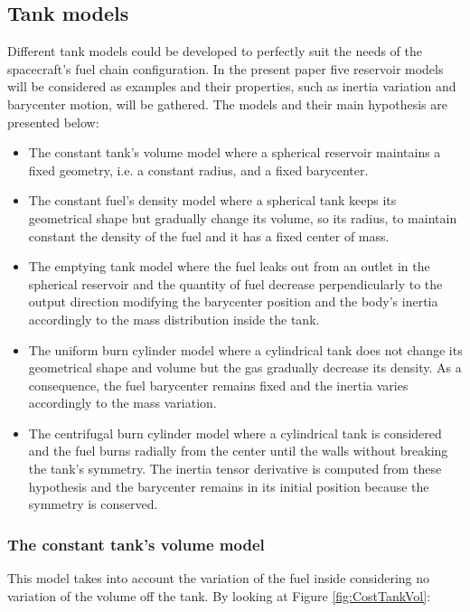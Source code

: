 \subsection{Tank models}
Different tank models could be developed to perfectly suit the needs of the spacecraft's fuel chain configuration. In the present paper five reservoir models will be considered as examples and their properties, such as inertia variation and barycenter motion, will be gathered.\newline
The models and their main hypothesis are presented below:

\begin{itemize}
	\item The constant tank's volume model where a spherical reservoir maintains a fixed geometry, i.e. a constant radius, and a fixed barycenter.
	\item The constant fuel's density model where a spherical tank keeps its geometrical shape but gradually change its volume, so its radius, to maintain constant the density of the fuel and it has a fixed center of mass. 
	\item The emptying tank model where the fuel leaks out from an outlet in the spherical reservoir and the quantity of fuel decrease perpendicularly to the output direction modifying the barycenter position and the body's inertia accordingly to the mass distribution inside the tank.
	\item The uniform burn cylinder model where a cylindrical tank does not change its geometrical shape and volume but the gas gradually decrease its density. As a consequence, the fuel barycenter remains fixed and the inertia varies accordingly to the mass variation.
	\item The centrifugal burn cylinder model where a cylindrical tank is considered and the fuel burns radially from the center until the walls without breaking the tank's symmetry. The inertia tensor derivative is computed from these hypothesis and the barycenter remains in its initial position because the symmetry is conserved.
\end{itemize}

\subsubsection{The constant tank's volume model}
This model takes into account the variation of the fuel inside considering no variation of the volume off the tank. By looking at Figure \ref{fig:CostTankVol}:

